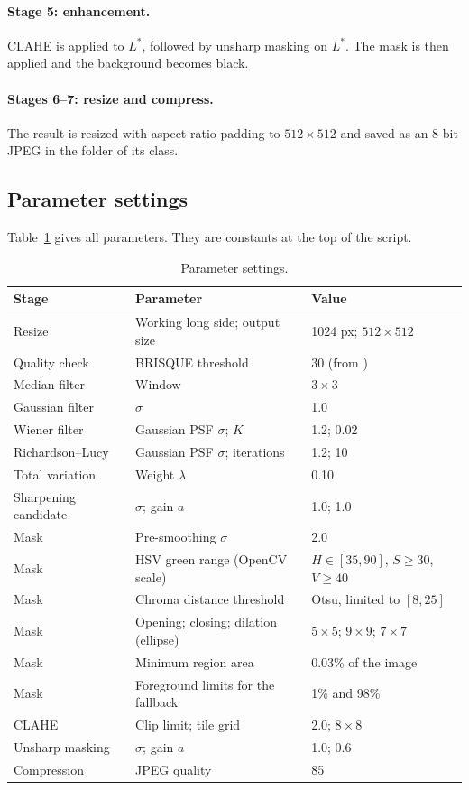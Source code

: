 \paragraph{Stage 5: enhancement.} CLAHE is applied to $L^*$, followed by unsharp masking on $L^*$. The mask is then applied and the background becomes black.

\paragraph{Stages 6--7: resize and compress.} The result is resized with aspect-ratio padding to $512\times512$ and saved as an 8-bit JPEG in the folder of its class.

\subsection{Parameter settings}
Table~\ref{tab:params} gives all parameters. They are constants at the top of the script.

\begin{table}[H]
\centering
\caption{Parameter settings.}
\label{tab:params}
\small
\begin{tabular}{lll}
\toprule
Stage & Parameter & Value \\
\midrule
Resize & Working long side; output size & 1024 px; $512\times512$ \\
Quality check & BRISQUE threshold & 30 (from \cite{jia2025}) \\
Median filter & Window & $3\times3$ \\
Gaussian filter & $\sigma$ & 1.0 \\
Wiener filter & Gaussian PSF $\sigma$; $K$ & 1.2; 0.02 \\
Richardson--Lucy & Gaussian PSF $\sigma$; iterations & 1.2; 10 \\
Total variation & Weight $\lambda$ & 0.10 \\
Sharpening candidate & $\sigma$; gain $a$ & 1.0; 1.0 \\
Mask & Pre-smoothing $\sigma$ & 2.0 \\
Mask & HSV green range (OpenCV scale) & $H\in[35,90]$, $S\ge30$, $V\ge40$ \\
Mask & Chroma distance threshold & Otsu, limited to $[8,25]$ \\
Mask & Opening; closing; dilation (ellipse) & $5\times5$; $9\times9$; $7\times7$ \\
Mask & Minimum region area & 0.03\% of the image \\
Mask & Foreground limits for the fallback & 1\% and 98\% \\
CLAHE & Clip limit; tile grid & 2.0; $8\times8$ \\
Unsharp masking & $\sigma$; gain $a$ & 1.0; 0.6 \\
Compression & JPEG quality & 85 \\
\bottomrule
\end{tabular}
\end{table}

